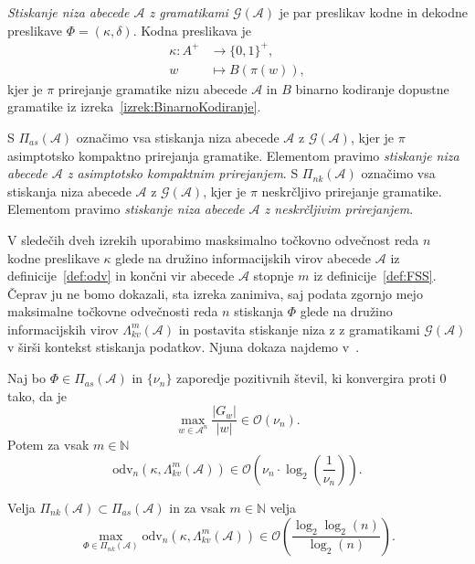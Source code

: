 \documentclass[fin1, tisk]{fmfdelo}
\providecommand{\abs}[1]{\left\lvert #1 \right\rvert}
\newcommand{\N}{\mathbb{N}}
\newcommand{\A}{\mathcal{A}}
\newcommand{\G}{\mathcal{G}}
\theoremstyle{definition}
\begin{document}
\begin{definicija}
    \emph{Stiskanje niza abecede $\A$ z gramatikami $\G(\A)$} je 
    par preslikav kodne in dekodne preslikave $\varPhi = (\kappa, \delta)$. Kodna preslikava je
    \begin{align*}
        \kappa \colon A^+ &\to \{ 0, 1\}^+,\\
        w &\mapsto B(\pi(w)),
    \end{align*}
    kjer je $\pi$ prirejanje gramatike nizu abecede $\A$ in
    $B$ binarno kodiranje dopustne gramatike iz izreka~\ref{izrek:BinarnoKodiranje}.
\end{definicija}

\begin{definicija}
    S $\varPi_{as}(\A)$ označimo vsa stiskanja niza abecede $\A$ z $\G(\A)$,
    kjer je $\pi$ asimptotsko kompaktno prirejanja gramatike. Elementom pravimo
    \emph{stiskanje niza abecede $\A$ z asimptotsko kompaktnim prirejanjem}.
    S $\varPi_{nk}(\A)$ označimo vsa stiskanja niza abecede $\A$ z $\G(\A)$,
    kjer je $\pi$ neskrčljivo prirejanje gramatike. Elementom pravimo
    \emph{stiskanje niza abecede $\A$ z neskrčljivim prirejanjem}.
\end{definicija}

V sledečih dveh izrekih uporabimo masksimalno točkovno odvečnost reda $n$ kodne preslikave 
$\kappa$ glede na družino informacijskih virov abecede $\A$ iz definicije~\ref{def:odv} in
končni vir abecede $\A$ stopnje $m$ iz definicije~\ref{def:FSS}. Čeprav ju ne bomo dokazali,
sta izreka zanimiva, saj podata zgornjo mejo maksimalne točkovne odvečnosti reda $n$ stiskanja 
$\varPhi$ glede na družino informacijskih virov $\Lambda_{kv}^m(\A)$ in postavita stiskanje niza 
z z gramatikami $\G(\A)$ v širši kontekst stiskanja podatkov. Njuna dokaza najdemo 
v~\cite{KiefferYang2000}.

\begin{izrek}
    Naj bo $\varPhi \in \varPi_{as}(\A)$ in $\{ \nu_n \}$ zaporedje pozitivnih števil,
    ki konvergira proti $0$ tako, da je
    \[
        \max_{w \in \A^n} \frac{\abs{G_w}}{\abs{w}} \in \mathcal{O}(\nu_n).
    \]
    Potem za vsak $m \in \N$
    \[
        \text{odv}_n \left( \kappa, \Lambda_{kv}^m(\A) \right) \in
        \mathcal{O} \left( \nu_n \cdot \log_2 \left( \frac{1}{\nu_n} \right) \right).
    \]
\end{izrek}

\begin{izrek}\label{izrek:RedKonvergenca}
    Velja $\varPi_{nk}(\A) \subset \varPi_{as}(\A)$ in za vsak $m \in \N$ velja 
    \[
        \max_{\varPhi \in \varPi_{nk}(\A)} \text{odv}_n \left( \kappa, \Lambda_{kv}^m(\A) \right) \in
        \mathcal{O} \left( \frac{\log_2 \log_2(n)}{\log_2(n)} \right).
    \]
\end{izrek}
\end{document}
